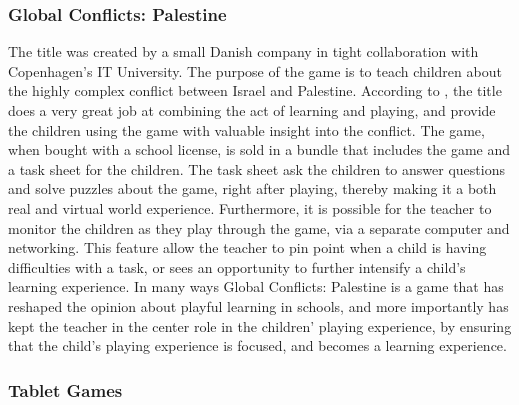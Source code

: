 \subsubsection{Global Conflicts: Palestine}

The title was created by a small Danish company in tight collaboration with Copenhagen's IT University. The purpose of the game is to teach children about the highly complex conflict between Israel and Palestine.
According to \cite{laeringpaaspil}, the title does a very great job at combining the act of learning and playing, and provide the children using the game with valuable insight into the conflict.
The game, when bought with a school license, is sold in a bundle that includes the game and a task sheet for the children.
The task sheet ask the children to answer questions and solve puzzles about the game, right after playing, thereby making it a both real and virtual world experience.
Furthermore, it is possible for the teacher to monitor the children as they play through the game, via a separate computer and networking.
This feature allow the teacher to pin point when a child is having difficulties with a task, or sees an opportunity to further intensify a child's learning experience.
In many ways Global Conflicts: Palestine is a game that has reshaped the opinion about playful learning in schools, and more importantly has kept the teacher in the center role in the children' playing experience, by ensuring that the child's playing experience is focused, and becomes a learning experience.\cite{laeringpaaspil}

\subsubsection{Tablet Games}

